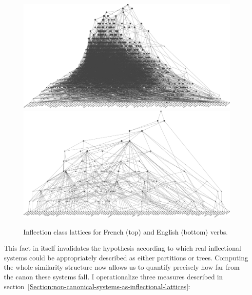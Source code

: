 \documentclass[output=paper]{langscibook}
\begin{document}
    \begin{figure}[p]
        \centering
        \includegraphics[width=\textwidth,keepaspectratio]{figures/lattice-pat-fr.pdf}
        \includegraphics[width=\textwidth,keepaspectratio]{figures/lattice-pat-en.pdf}
        \caption{Inflection class lattices for French (top) and English (bottom) verbs.}
        \label{fig:beniamine:treillisPatsFCA}
    \end{figure}
    
    This fact in itself invalidates the hypothesis according to which real inflectional systems could be appropriately described as either partitions or trees. Computing the whole similarity structure now allows us to quantify precisely how far from the canon these systems fall. I operationalize three measures described in section~\ref{Section:non-canonical-systems-as-inflectional-lattices}:
    
\end{document}
